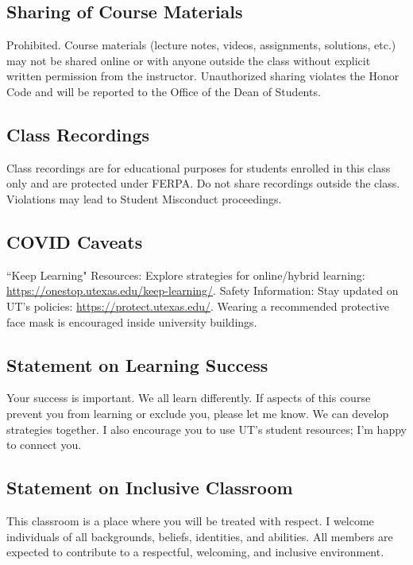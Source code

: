 \documentclass[11pt,fourier]{article}
\begin{document}
\subsection*{Sharing of Course Materials}
Prohibited. Course materials (lecture notes, videos, assignments, solutions, etc.) may not be shared online or with anyone outside the class without explicit written permission from the instructor. Unauthorized sharing violates the Honor Code and will be reported to the Office of the Dean of Students.

\subsection*{Class Recordings}
Class recordings are for educational purposes for students enrolled in this class only and are protected under FERPA. Do not share recordings outside the class. Violations may lead to Student Misconduct proceedings.

\subsection*{COVID Caveats}
``Keep Learning" Resources: Explore strategies for online/hybrid learning: \url{https://onestop.utexas.edu/keep-learning/}.
Safety Information: Stay updated on UT's policies: \url{https://protect.utexas.edu/}. Wearing a recommended protective face mask is encouraged inside university buildings.

\subsection*{Statement on Learning Success}
Your success is important. We all learn differently. If aspects of this course prevent you from learning or exclude you, please let me know. We can develop strategies together. I also encourage you to use UT's student resources; I'm happy to connect you.

\subsection*{Statement on Inclusive Classroom}
This classroom is a place where you will be treated with respect. I welcome individuals of all backgrounds, beliefs, identities, and abilities. All members are expected to contribute to a respectful, welcoming, and inclusive environment.
\end{document}
